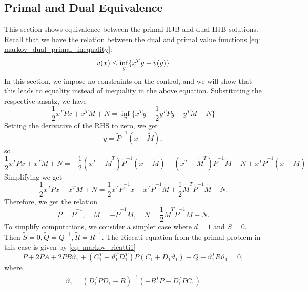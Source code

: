 \subsection{Primal and Dual Equivalence}
This section shows equivalence between the primal HJB and dual HJB solutions. Recall that we have the relation between the dual and primal value functions \eqref{eq: markov_dual_primal_inequality}:
\begin{equation*}
    v(x) \le \inf_y \{x^T y - \Tilde{v}(y)  \}
\end{equation*}
In this section, we impose no constraints on the control, and we will show that this leads to equality instead of inequality in the above equation. Substituting the respective ansatz, we have
\begin{equation*}
    \frac12 x^T P x + x^T M + N = \inf_y \bigg\{ x^T y - \frac12 y^T \tilde{P} y - y^T \tilde{M} - \tilde{N}  \bigg\}
\end{equation*}
Setting the derivative of the RHS to zero, we get 
\begin{equation*}
    y = \tilde{P}^{-1}(x - \tilde{M}),
\end{equation*}
so
\begin{equation*}
    \frac12 x^T P x + x^T M + N  = - \frac12 (x^T - \tilde{M}^T)\tilde{P}^{-1} (x-\tilde{M}) - (x^T - \tilde{M}^T)\tilde{P}^{-1} \tilde{M} - \tilde{N} + x^T \tilde{P}^{-1}(x - \tilde{M})
\end{equation*}
Simplifying we get
\begin{equation*}
    \frac12 x^T P x + x^T M + N = \frac12 x^T \tilde{P}^{-1}x - x^T \tilde{P}^{-1}\tilde{M} + \frac12 \tilde{M}^T \tilde{P}^{-1} \tilde{M} - \tilde{N}.
\end{equation*}
Therefore, we get the relation
\begin{equation*}
    P = \tilde{P}^{-1}, \quad M = -\tilde{P}^{-1} \tilde{M}, \quad N =  \frac12 \tilde{M}^T \tilde{P}^{-1} \tilde{M} - \tilde{N}.
\end{equation*}
To simplify computations, we consider a simpler case where $d=1$ and $S = 0$. Then $\tilde{S}=0, \tilde{Q}= Q^{-1}, \tilde{R} = R^{-1}$.
The Riccati equation from the primal problem in this case is given by \eqref{eq: markov_ricatti1}
\begin{equation*}
     \dot{P}  +  2P A + 2P B \vartheta_1 + (C_1^T + \vartheta_1^T D_1^T)P(C_1 + D_1 \vartheta_1) 
     -  Q -  \vartheta_1^T R \vartheta_1 = 0,
\end{equation*}
where 
\begin{align*}
    \vartheta_1 = ( D_1^T  P D_1 - R)^{-1} ( - B^T  P - D_1^T  P C_1 )
\end{align*}
